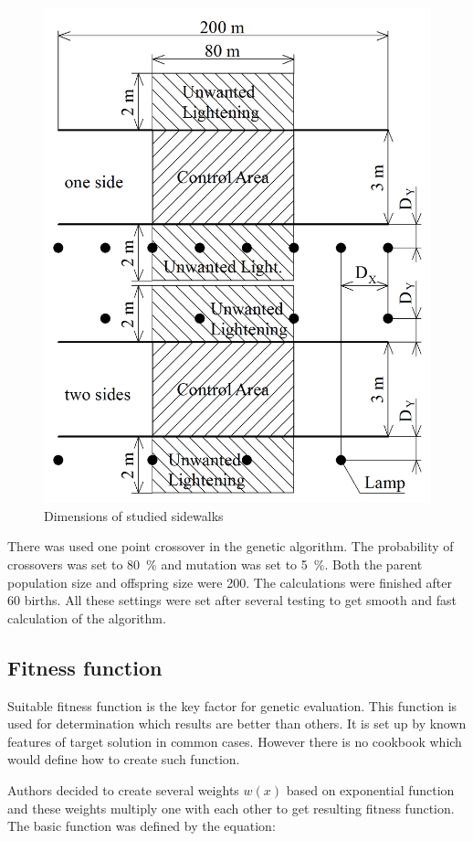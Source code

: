 \begin{figure}[htb]
  \centering
  \includegraphics[width=0.8\columnwidth]{kotyChodniku}
  \caption{Dimensions of studied sidewalks}
  \label{fig:sidewalk}
\end{figure}

There was used one point crossover in the genetic algorithm. The probability of crossovers was set to 80~\% and mutation was set to 5~\%. Both the parent population size and offspring size were 200. The calculations were finished after 60 births. All these settings were set after several testing to get smooth and fast calculation of the algorithm.

\subsection{Fitness function}
Suitable fitness function is the key factor for genetic evaluation. This function is used for determination which results are better than others. It is set up by known features of target solution in common cases. However there is no cookbook which would define how to create such function.

Authors decided to create several weights $w\left(x\right)$ based on exponential function and these weights multiply one with each other to get resulting fitness function. The basic function was defined by the equation:

